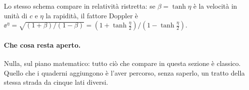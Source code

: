 Lo stesso schema compare in relativit\`a ristretta: se $\beta=\tanh\eta$ \`e
la velocit\`a in unit\`a di $c$ e $\eta$ la rapidit\`a, il fattore Doppler
\`e $\ee^{\eta}=\sqrt{(1+\beta)/(1-\beta)}=(1+\tanh\frac\eta2)/(1-\tanh\frac\eta2)$.

\paragraph{Che cosa resta aperto.}
Nulla, sul piano matematico: tutto ci\`o che compare in questa sezione \`e
classico. Quello che i quaderni aggiungono \`e l'aver percorso, senza saperlo,
un tratto della stessa strada da cinque lati diversi.
